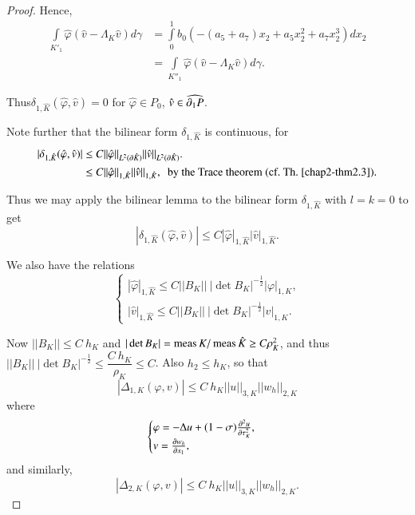 \begin{proof}
Hence,
\begin{equation*}
\begin{split}
\int\limits_{K'_{1}}\hat{\varphi}(\hat{v}-\Lambda_{K}\hat{v})d\gamma
&=
\int\limits^{1}_{0}b_{0}(-(a_{5}+a_{7})x_{2}+a_{5}x^{2}_{2}+a_{7}x^{3}_{2})dx_{2}\\
&=\int\limits_{K''_{1}}\hat{\varphi}(\hat{v}-\Lambda_{K}\hat{v})d\gamma.
\end{split}\tag{11.28}\label{chap11-eq11.28}
\end{equation*}

Thus\pageoriginale $\delta_{1,\hat{K}}(\hat{\varphi},\hat{v})=0$ for
$\hat{\varphi}\in P_{0}$, $\hat{v}\in \widehat{\partial_{1}P}$. 

Note further that the bilinear form $\delta_{1,\hat{K}}$ is
continuous, for
\begin{align*}
|\delta_{1,\hat{K}}(\hat{\varphi},\hat{v})| &\leq
C||\hat{\varphi}||_{L^{2}(\p \hat{K})}||\hat{v}||_{L^{2}(\p
  \hat{K})}.\\
&\leq C||\hat{\varphi}||_{1,\hat{K}}||\hat{v}||_{1,\hat{K}},\text{~ by
  the Trace theorem (cf.\@ Th.\@ \ref{chap2-thm2.3}).} 
\end{align*}

Thus we may apply the bilinear lemma to the bilinear form
$\delta_{1,\hat{K}}$ with $l=k=0$ to get
\begin{equation*}
|\delta_{1,\hat{K}}(\hat{\varphi},\hat{v})|\leq
C|\hat{\varphi}|_{1,\hat{K}}|\hat{v}|_{1,\hat{K}}.\tag{11.29}\label{chap11-eq11.29} 
\end{equation*}

We also have the relations
\begin{equation*}
\begin{cases}
|\hat{\varphi}|_{1,\hat{K}}\leq C||B_{K}||~|\det
B_{K}|^{-\frac{1}{2}}|\varphi|_{1,K},\\
|\hat{v}|_{1,\hat{K}}\leq C||B_{K}||~|\det B_{K}|^{-\frac{1}{2}}|v|_{1,K}.
\end{cases}\tag{11.30}\label{chap11-eq11.30} 
\end{equation*}

Now $||B_{K}||\leq C\ h_{K}$ and $|\det B_{K}|=\operatorname{meas} K/\operatorname{meas}
\hat{K}\geq C\rho^{2}_{K}$, and thus $||B_{K}||~|\det
B_{K}|^{-\frac{1}{2}}\leq \dfrac{C\ h_{K}}{\rho_{K}}\leq C$. Also
$h_{2}\leq h_{K}$, so that
\begin{equation*}
|\Delta_{1,K}(\varphi,v)|\leq
C\ h_{K}||u||_{3,K}||w_{h}||_{2,K}\tag{11.31}\label{chap11-eq11.31} 
\end{equation*}
where
$$
\begin{cases}
\varphi=-\Delta u+(1-\sigma)\frac{\partial^{2}u}{\partial \tau^{2}_{K}},\\
v=\frac{\partial w_{h}}{\partial x_{1}},
\end{cases}
$$
and similarly,
\begin{equation*}
|\Delta_{2,K}(\varphi,v)|\leq
C\ h_{K}||u||_{3,K}||w_{h}||_{2,K}.\tag{11.32}\label{chap11-eq11.32} 
\end{equation*}


\end{proof}
